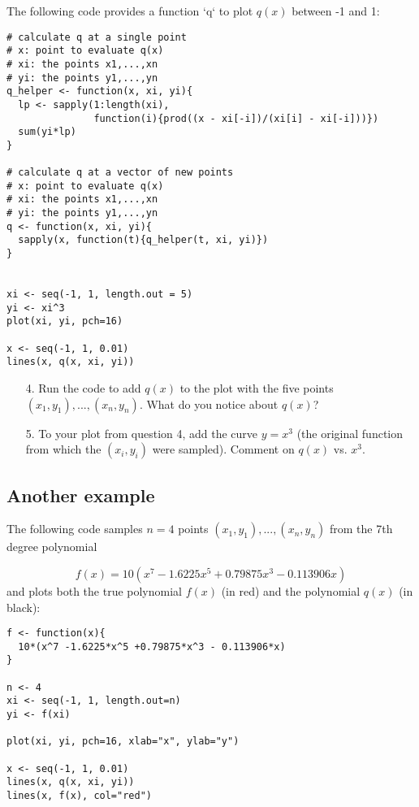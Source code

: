 \documentclass[11pt]{article}
\begin{document}
The following code provides a function `q` to plot $q(x)$ between -1 and 1:

\begin{verbatim}
# calculate q at a single point
# x: point to evaluate q(x)
# xi: the points x1,...,xn
# yi: the points y1,...,yn
q_helper <- function(x, xi, yi){
  lp <- sapply(1:length(xi), 
               function(i){prod((x - xi[-i])/(xi[i] - xi[-i]))})
  sum(yi*lp)
}

# calculate q at a vector of new points
# x: point to evaluate q(x)
# xi: the points x1,...,xn
# yi: the points y1,...,yn
q <- function(x, xi, yi){
  sapply(x, function(t){q_helper(t, xi, yi)})
}


xi <- seq(-1, 1, length.out = 5)
yi <- xi^3
plot(xi, yi, pch=16)

x <- seq(-1, 1, 0.01)
lines(x, q(x, xi, yi))
\end{verbatim}

\begin{enumerate}
\item[4.] Run the code to add $q(x)$ to the plot with the five points $(x_1, y_1),...,(x_n, y_n)$. What do you notice about $q(x)$?

\vspace{3cm}

\item[5.]  To your plot from question 4, add the curve $y = x^3$ (the original function from which the $(x_i, y_i)$ were sampled). Comment on $q(x)$ vs. $x^3$.
\end{enumerate}

\newpage

\subsection*{Another example}

The following code samples $n=4$ points $(x_1, y_1),...,(x_n, y_n)$ from the 7th degree polynomial

$$f(x) = 10(x^7 - 1.6225x^5 +0.79875x^3 - 0.113906x)$$
and plots both the true polynomial $f(x)$ (in red) and the polynomial $q(x)$ (in black):

\begin{verbatim}
f <- function(x){
  10*(x^7 -1.6225*x^5 +0.79875*x^3 - 0.113906*x)
}

n <- 4
xi <- seq(-1, 1, length.out=n)
yi <- f(xi)

plot(xi, yi, pch=16, xlab="x", ylab="y")

x <- seq(-1, 1, 0.01)
lines(x, q(x, xi, yi))
lines(x, f(x), col="red")
\end{verbatim}
\end{document}
